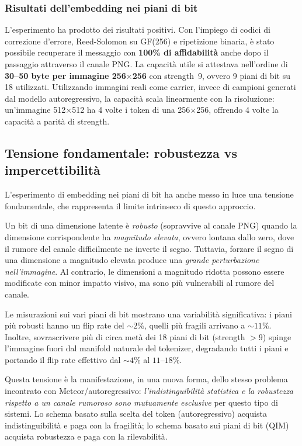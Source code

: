 \subsubsection{Risultati dell'embedding nei piani di bit}

L'esperimento ha prodotto dei risultati positivi. Con l'impiego di codici di correzione d'errore, Reed-Solomon su GF(256) e ripetizione binaria, è stato possibile recuperare il messaggio con \textbf{100\% di affidabilità} anche dopo il passaggio attraverso il canale PNG. La capacità utile si attestava nell'ordine di \textbf{30--50 byte per immagine 256$\times$256} con strength~9, ovvero 9 piani di bit su 18 utilizzati. Utilizzando immagini reali come carrier, invece di campioni generati dal modello autoregressivo, la capacità scala linearmente con la risoluzione: un'immagine 512$\times$512 ha 4 volte i token di una 256$\times$256, offrendo 4 volte la capacità a parità di strength.

\subsection{Tensione fondamentale: robustezza vs impercettibilità}

L'esperimento di embedding nei piani di bit ha anche messo in luce una tensione fondamentale, che rappresenta il limite intrinseco di questo approccio.

Un bit di una dimensione latente è \emph{robusto} (sopravvive al canale PNG) quando la dimensione corrispondente ha \emph{magnitudo elevata}, ovvero lontana dallo zero, dove il rumore del canale difficilmente ne inverte il segno. Tuttavia, forzare il segno di una dimensione a magnitudo elevata produce una \emph{grande perturbazione nell'immagine}. Al contrario, le dimensioni a magnitudo ridotta possono essere modificate con minor impatto visivo, ma sono più vulnerabili al rumore del canale.

Le misurazioni sui vari piani di bit mostrano una variabilità significativa: i piani più robusti hanno un flip rate del $\sim 2\%$, quelli più fragili arrivano a $\sim 11\%$. Inoltre, sovrascrivere più di circa metà dei 18 piani di bit (strength $> 9$) spinge l'immagine fuori dal manifold naturale del tokenizer, degradando tutti i piani e portando il flip rate effettivo dal $\sim 4\%$ al $11$--$18\%$.

Questa tensione è la manifestazione, in una nuova forma, dello stesso problema incontrato con Meteor/autoregressivo: \emph{l'indistinguibilità statistica e la robustezza rispetto a un canale rumoroso sono mutuamente esclusive} per questo tipo di sistemi. Lo schema basato sulla scelta del token (autoregressivo) acquista indistinguibilità e paga con la fragilità; lo schema basato sui piani di bit (QIM) acquista robustezza e paga con la rilevabilità.

